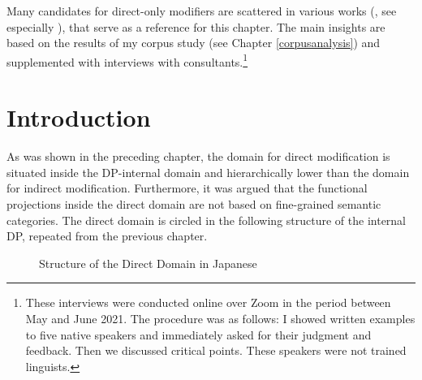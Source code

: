 \documentclass [output=book,colorlinks,citecolor=brown]{langscibook}
\begin{document}
Many candidates for direct-only modifiers are scattered in various works (\citealt{yamakido:2000:japanese, yamakido:2005:nature, yamakido:2007:nature, ayano:2010:revisiting, watanabe:2012:direct, morita:2010:internal, morita:2011:three, morita:2013:morph, nagano:2015:RA, nagano:2016:are}, see especially \citealt{watanabe:2017:attributive, muraki:1996:imi, muraki:2009:nihongo, muraki:2012:nihongo}), that serve as a reference for this chapter. The main insights are based on the results of my corpus study (see Chapter \ref{corpusanalysis}) and supplemented with interviews with consultants.\footnote{These interviews were conducted online over Zoom in the period between May and June 2021. The procedure was as follows: I showed written examples to five native speakers and immediately asked for their judgment and feedback. Then we discussed critical points. These speakers were not trained linguists.}

\section{Introduction}

As was shown in the preceding chapter, the domain for direct modification is situated inside the DP-internal domain and hierarchically lower than the domain for indirect modification. Furthermore, it was argued that the functional projections inside the direct domain are not based on fine-grained semantic categories. The direct domain is circled in the following structure of the internal DP, repeated from the previous chapter.


\begin{figure}[H]
\centering


 \caption{Structure of the Direct Domain in Japanese}
 \label{fig:Structure of the Direct Domain in Japanese2}
\end{figure}
\end{document}
